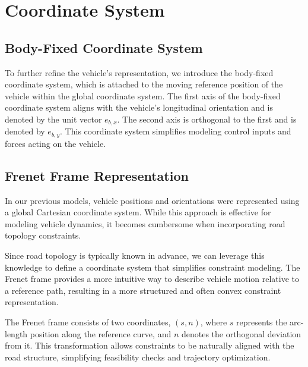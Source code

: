 \section{Coordinate System} \label{sec:coordinate_system}

\subsection{Body-Fixed Coordinate System} \label{subsec:body_fixed_coordinate_system}

To further refine the vehicle's representation, we introduce the body-fixed coordinate system, which is attached to the moving reference position of
the vehicle within the global coordinate system.
The first axis of the body-fixed coordinate system aligns with the vehicle's longitudinal orientation and is denoted by the unit vector $e_{b,x}$.
The second axis is orthogonal to the first and is denoted by $e_{b,y}$.
This coordinate system simplifies modeling control inputs and forces acting on the vehicle.

\subsection{Frenet Frame Representation} \label{subsec:frenet_frame}

In our previous models, vehicle positions and orientations were represented using a global Cartesian coordinate system.
While this approach is effective for modeling vehicle dynamics, it becomes cumbersome when incorporating road topology constraints.

Since road topology is typically known in advance, we can leverage this knowledge to define a coordinate system that simplifies constraint modeling.
The Frenet frame provides a more intuitive way to describe vehicle motion relative to a reference path, resulting in a more structured and often
convex constraint representation.

The Frenet frame consists of two coordinates, $(s, n)$, where $s$ represents the arc-length position along the reference curve, and $n$ denotes the
orthogonal deviation from it.
This transformation allows constraints to be naturally aligned with the road structure, simplifying feasibility checks and trajectory optimization.

